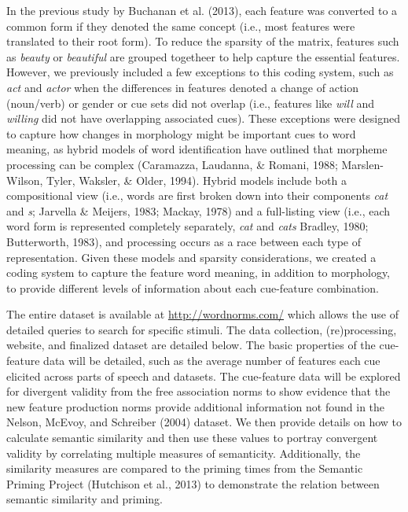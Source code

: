 \documentclass[english,,man]{apa6}
\begin{document}
In the previous study by Buchanan et al. (2013), each feature was converted to a common form if they denoted the same concept (i.e., most features were translated to their root form). To reduce the sparsity of the matrix, features such as \emph{beauty} or \emph{beautiful} are grouped togetheer to help capture the essential features. However, we previously included a few exceptions to this coding system, such as \emph{act} and \emph{actor} when the differences in features denoted a change of action (noun/verb) or gender or cue sets did not overlap (i.e., features like \emph{will} and \emph{willing} did not have overlapping associated cues). These exceptions were designed to capture how changes in morphology might be important cues to word meaning, as hybrid models of word identification have outlined that morpheme processing can be complex (Caramazza, Laudanna, \& Romani, 1988; Marslen-Wilson, Tyler, Waksler, \& Older, 1994). Hybrid models include both a compositional view (i.e., words are first broken down into their components \emph{cat} and \emph{s}; Jarvella \& Meijers, 1983; Mackay, 1978) and a full-listing view (i.e., each word form is represented completely separately, \emph{cat} and \emph{cats} Bradley, 1980; Butterworth, 1983), and processing occurs as a race between each type of representation. Given these models and sparsity considerations, we created a coding system to capture the feature word meaning, in addition to morphology, to provide different levels of information about each cue-feature combination.

The entire dataset is available at \url{http://wordnorms.com/} which allows the use of detailed queries to search for specific stimuli. The data collection, (re)processing, website, and finalized dataset are detailed below. The basic properties of the cue-feature data will be detailed, such as the average number of features each cue elicited across parts of speech and datasets. The cue-feature data will be explored for divergent validity from the free association norms to show evidence that the new feature production norms provide additional information not found in the Nelson, McEvoy, and Schreiber (2004) dataset. We then provide details on how to calculate semantic similarity and then use these values to portray convergent validity by correlating multiple measures of semanticity. Additionally, the similarity measures are compared to the priming times from the Semantic Priming Project (Hutchison et al., 2013) to demonstrate the relation between semantic similarity and priming.
\end{document}
